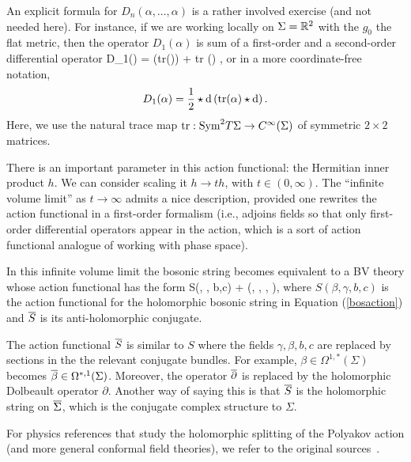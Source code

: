 An explicit formula for $D_n(\alpha,\ldots,\alpha)$ is a rather involved exercise (and not needed here).
For instance, if we are working locally on $\Sigma = \RR^2$ with the $g_0$ the flat metric, 
then the operator $D_1(\alpha)$ is sum of a first-order and a second-order differential operator
\ben
D_1(\alpha) =   ({\rm tr}(\alpha))  +  {\rm tr} (\alpha)  , 
\een
or in a more coordinate-free notation, 
\[
D_1(\alpha) = \frac{1}{2} \star \d \left({\rm tr}(\alpha) \star \d\right).
\] 
Here, we use the natural trace map ${\rm tr} : \Sym^2 T\Sigma \to C^\infty(\Sigma)$ of symmetric $2\times2$ matrices. 

There is an important parameter in this action functional: the Hermitian inner product $h$.
We can consider scaling it $h \to t h$, with $t \in (0,\infty)$.
The ``infinite volume limit'' as $t \to \infty$ admits a nice description,
provided one rewrites the action functional in a first-order formalism
(i.e., adjoins fields so that only first-order differential operators appear in the action,
which is a sort of action functional analogue of working with phase space).

\begin{lem} 
In this infinite volume limit
the bosonic string becomes equivalent to a BV theory whose action functional has the form
\ben
S(\beta, \gamma, b,c) + (\Bar{\beta}, \Bar{\gamma}, , ),
\een
where $S(\beta, \gamma, b,c)$ is the action functional for the holomorphic bosonic string in Equation (\ref{bosaction}) and $\Bar{S}$ is its anti-holomorphic conjugate. 
\end{lem}

\begin{rmk} 
The action functional $\Bar{S}$ is similar to $S$ where the fields $\gamma,\beta,b,c$ are replaced by sections in the the relevant conjugate bundles. 
For example, $\beta \in \Omega^{1,*}(\Sigma)$ becomes $\Bar{\beta} \in \Omega^{*,1} (\Sigma)$. 
Moreover, the operator $\dbar$ is replaced by the holomorphic Dolbeault operator $\partial$. 
Another way of saying this is that $\Bar{S}$ is the holomorphic string on $\Bar{\Sigma}$, which is the conjugate complex structure to $\Sigma$. 
\end{rmk}

\begin{rmk}
For physics references that study the holomorphic splitting of the Polyakov action (and more general conformal field theories), 
we refer to the original sources~\cite{Belavin, Laz}.
\end{rmk}

